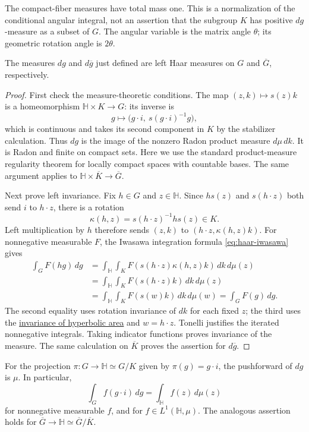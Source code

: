 The compact-fiber measures have total mass one. This is a normalization of the conditional angular integral, not an assertion that the subgroup $K$ has positive $dg$-measure as a subset of $G$. The angular variable is the matrix angle $\theta$; its geometric rotation angle is $2\theta$.

\begin{proposition}\label{modular.haar-invariance}
The measures $dg$ and $d\overline g$ just defined are left Haar measures on $G$ and $\overline G$, respectively.
\end{proposition}

\begin{proof}
First check the measure-theoretic conditions. The map $(z,k)\mapsto s(z)k$ is a homeomorphism $\mathbb H\times K\to G$: its inverse is
\[
 g\longmapsto\bigl(g\cdot i,\ s(g\cdot i)^{-1}g\bigr),
\]
which is continuous and takes its second component in $K$ by the stabilizer calculation. Thus $dg$ is the image of the nonzero Radon product measure $d\mu\,dk$. It is Radon and finite on compact sets. Here we use the standard product-measure regularity theorem for locally compact spaces with countable bases. The same argument applies to $\mathbb H\times\overline K\to\overline G$.

Next prove left invariance. Fix $h\in G$ and $z\in\mathbb H$. Since $hs(z)$ and $s(h\cdot z)$ both send $i$ to $h\cdot z$, there is a rotation
\[
 \kappa(h,z)=s(h\cdot z)^{-1}hs(z)\in K.
\]
Left multiplication by $h$ therefore sends $(z,k)$ to $(h\cdot z,\kappa(h,z)k)$. For nonnegative measurable $F$, the Iwasawa integration formula \eqref{eq:haar-iwasawa} gives
\[
 \begin{aligned}
 \int_G F(hg)\,dg
 &=\int_{\mathbb H}\int_K
   F(s(h\cdot z)\kappa(h,z)k)\,dk\,d\mu(z)\\
 &=\int_{\mathbb H}\int_K
   F(s(h\cdot z)k)\,dk\,d\mu(z)\\
 &=\int_{\mathbb H}\int_K F(s(w)k)\,dk\,d\mu(w)
 =\int_G F(g)\,dg.
 \end{aligned}
\]
The second equality uses rotation invariance of $dk$ for each fixed $z$; the third uses the \hyperref[hyperbolic.invariance]{invariance of hyperbolic area} and $w=h\cdot z$. Tonelli justifies the iterated nonnegative integrals. Taking indicator functions proves invariance of the measure. The same calculation on $\overline K$ proves the assertion for $d\overline g$.
\end{proof}

\begin{proposition}\label{hyperbolic.haar-quotient}
For the projection $\pi:G\to\mathbb H\simeq G/K$ given by $\pi(g)=g\cdot i$, the pushforward of $dg$ is $\mu$. In particular,
\begin{equation}\label{eq:haar-hyperbolic-quotient}
 \int_G f(g\cdot i)\,dg=\int_{\mathbb H}f(z)\,d\mu(z)
\end{equation}
for nonnegative measurable $f$, and for $f\in L^1(\mathbb H,\mu)$. The analogous assertion holds for $\overline G\to\mathbb H\simeq\overline G/\overline K$.
\end{proposition}

